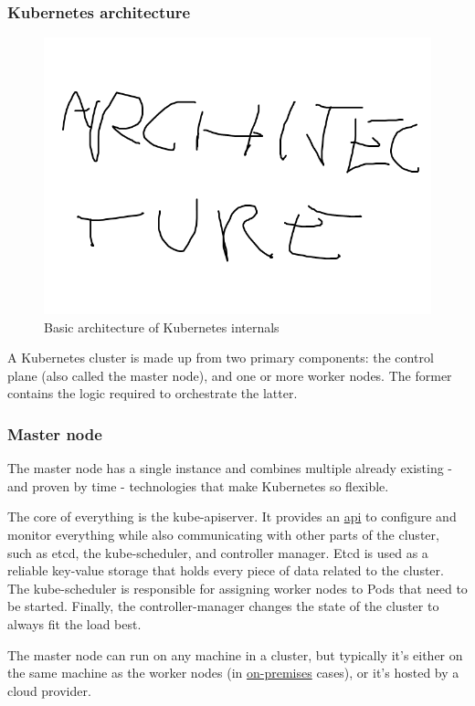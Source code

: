 \subsubsection{Kubernetes architecture}
\begin{figure}[H]
	\centering
	\includegraphics[width=\textwidth]{images/archi.png}
	\caption{Basic architecture of Kubernetes internals}
	\label{fig:kube-arch}
\end{figure}
A Kubernetes cluster is made up from two primary components: the control plane (also called the master node), and one or more worker nodes. The former contains the logic required to orchestrate the latter.

\subsubsection{Master node}
The master node has a single instance and combines multiple already existing - and proven by time - technologies that make Kubernetes so flexible.

The core of everything is the kube-apiserver. It provides an \underline{\gls{api}} to configure and monitor everything while also communicating with other parts of the cluster, such as etcd\cite{etcd}, the kube-scheduler, and controller manager. Etcd is used as a reliable key-value storage that holds every piece of data related to the cluster. The kube-scheduler is responsible for assigning worker nodes to Pods that need to be started. Finally, the controller-manager changes the state of the cluster to always fit the load best.

The master node can run on any machine in a cluster, but typically it's either on the same machine as the worker nodes (in \underline{\gls{on-premises}} cases), or it's hosted by a cloud provider.

